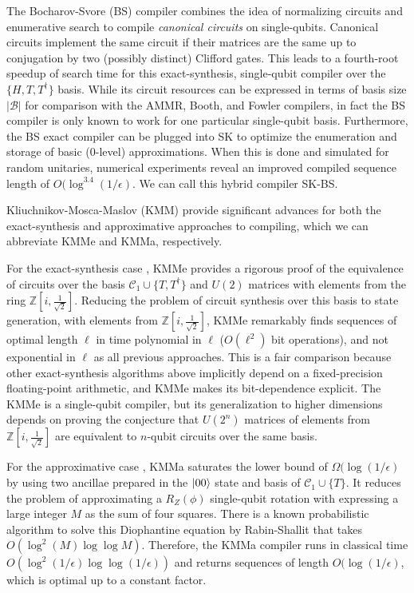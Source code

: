 The Bocharov-Svore (BS) compiler combines the idea of normalizing circuits
and enumerative search to compile \emph{canonical circuits} on single-qubits.
Canonical circuits
implement the same circuit if their matrices are the same up to
conjugation by two (possibly distinct) Clifford gates. This leads to
a fourth-root speedup of search time for this exact-synthesis, single-qubit
compiler over the $\{H, T, T^{\dagger} \}$ basis. While its circuit resources
can be expressed in terms of basis size $|\mathcal{B}|$ for comparison with
the AMMR, Booth, and Fowler compilers, in fact the BS compiler is only known
to work for one particular single-qubit basis. Furthermore, the BS exact
compiler can be plugged into SK to optimize the enumeration and storage of
basic (0-level) approximations. When this is done and simulated for
random unitaries, numerical experiments reveal an improved compiled
sequence length of $O(\log^{3.4}(1/\epsilon)$. We can call this hybrid
compiler SK-BS.

Kliuchnikov-Mosca-Maslov (KMM) provide significant advances for both the
exact-synthesis and approximative approaches to compiling, which we can
abbreviate KMMe and KMMa, respectively.

For the
exact-synthesis case \cite{Kliuchnikov2012e},
KMMe provides a rigorous proof of the equivalence
of circuits over the basis $\mathcal{C}_1 \cup \{T, T^{\dagger} \}$ and $U(2)$ matrices
with elements from the ring $\mathbb{Z}\left[i,\frac{1}{\sqrt{2}}\right]$.
Reducing the problem of circuit synthesis over this basis to state
generation, with elements from $\mathbb{Z}\left[i,\frac{1}{\sqrt{2}}\right]$,
KMMe remarkably finds sequences of optimal length $\ell$ in time
polynomial in $\ell$
($O(\ell ^2)$ bit operations), and not exponential in $\ell$ as
all previous approaches. This is a fair comparison because other 
exact-synthesis algorithms above implicitly
depend on a fixed-precision floating-point
arithmetic, and KMMe makes its bit-dependence explicit. The KMMe is
a single-qubit compiler, but its generalization to higher dimensions
depends on proving the conjecture that
$U(2^n)$ matrices of elements from $\mathbb{Z}\left[i,\frac{1}{\sqrt{2}}\right]$
are equivalent to $n$-qubit circuits over the same basis.

For the approximative case \cite{Kliuchnikov2012a}, KMMa saturates the lower
bound of $\Omega(\log(1/\epsilon)$ by using two ancillae prepared in the
$\left\vert{00}\right\rangle$ state and basis of $\mathcal{C}_1 \cup \{ T \}$.
It reduces the problem of approximating a
$R_Z(\phi)$ single-qubit rotation with expressing a large integer $M$ as the
sum of four squares. There is a known probabilistic algorithm to
solve this Diophantine equation
by Rabin-Shallit \cite{Rabin} that takes $O(\log^2(M)\log\log M)$. Therefore,
the KMMa compiler runs in classical time $O(\log^2(1/\epsilon)\log\log(1/\epsilon))$
and returns sequences of length $O(\log(1/\epsilon)$, which is optimal up to
a constant factor.

